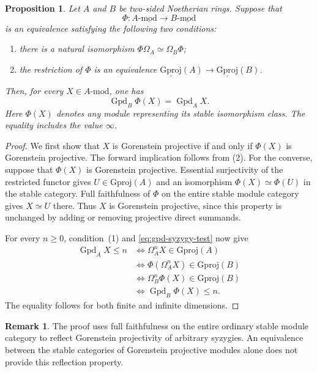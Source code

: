 \documentclass[12pt,a4paper,english,reqno]{amsart}
\numberwithin{equation}{section}
\theoremstyle{plain}
\newtheorem{proposition}[theorem]{Proposition}
\theoremstyle{definition}
\newtheorem{remark}[theorem]{Remark}
\begin{document}
\begin{proposition}
\label{prop:gpd-stable-criterion}
Let $A$ and $B$ be two-sided Noetherian rings.  Suppose that
\[
  \Phi:A\text{-}\underline{\mathrm{mod}}
       \longrightarrow B\text{-}\underline{\mathrm{mod}}
\]
is an equivalence satisfying the following two conditions:
\begin{enumerate}
\item there is a natural isomorphism
      $\Phi\Omega_A\simeq\Omega_B\Phi$;
\item the restriction of $\Phi$ is an equivalence
      $\underline{\mathrm{Gproj}}(A)
       \longrightarrow\underline{\mathrm{Gproj}}(B)$.
\end{enumerate}
Then, for every $X\in A\text{-}\mathrm{mod}$, one has
\[
  \operatorname{Gpd}_B\Phi(X)=\operatorname{Gpd}_A X.
\]
Here $\Phi(X)$ denotes any module representing its stable isomorphism
class.  The equality includes the value $\infty$.
\end{proposition}

\begin{proof}
We first show that $X$ is Gorenstein projective if and only if $\Phi(X)$
is Gorenstein projective.  The forward implication follows from (2).
For the converse, suppose that $\Phi(X)$ is Gorenstein projective.
Essential surjectivity of the restricted functor gives
$U\in\mathrm{Gproj}(A)$ and an isomorphism
$\Phi(X)\simeq\Phi(U)$ in the stable category.  Full faithfulness of
$\Phi$ on the entire stable module category gives $X\simeq U$ there.
Thus $X$ is Gorenstein projective, since this property is unchanged by
adding or removing projective direct summands.

For every $n\geq 0$, condition~(1) and
\eqref{eq:gpd-syzygy-test} now give
\[
\begin{aligned}
 \operatorname{Gpd}_A X\leq n
 &\Longleftrightarrow \Omega_A^nX\in\mathrm{Gproj}(A)\\
 &\Longleftrightarrow \Phi(\Omega_A^nX)\in\mathrm{Gproj}(B)\\
 &\Longleftrightarrow \Omega_B^n\Phi(X)\in\mathrm{Gproj}(B)\\
 &\Longleftrightarrow \operatorname{Gpd}_B\Phi(X)\leq n.
\end{aligned}
\]
The equality follows for both finite and infinite dimensions.
\end{proof}

\begin{remark}
\label{rem:gpd-requires-reflection}
The proof uses full faithfulness on the entire ordinary stable module
category to reflect Gorenstein projectivity of arbitrary syzygies.
An equivalence between the stable categories of Gorenstein projective
modules alone does not provide this reflection property.
\end{remark}
\end{document}

